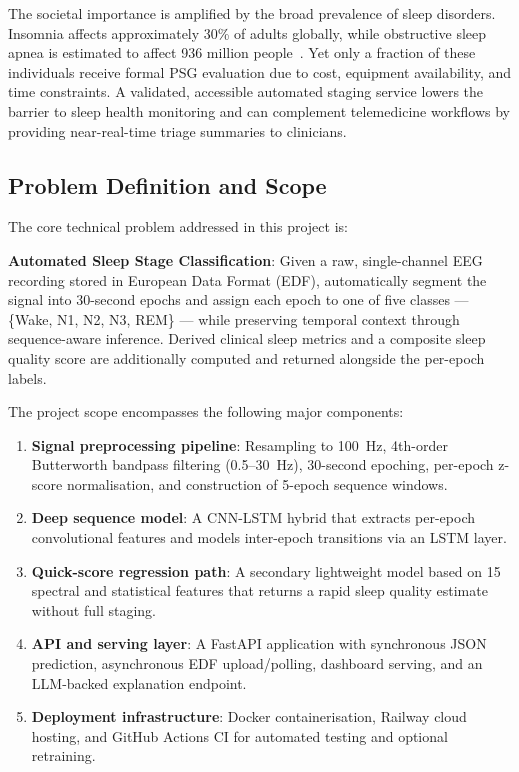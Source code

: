 \documentclass[10pt]{article}
\begin{document}
The societal importance is amplified by the broad prevalence of sleep disorders. Insomnia affects approximately 30\% of adults globally, while obstructive sleep apnea is estimated to affect 936 million people~\cite{benjafield2019estimation}. Yet only a fraction of these individuals receive formal PSG evaluation due to cost, equipment availability, and time constraints. A validated, accessible automated staging service lowers the barrier to sleep health monitoring and can complement telemedicine workflows by providing near-real-time triage summaries to clinicians.

\subsection{Problem Definition and Scope}
\label{sec:problem}

The core technical problem addressed in this project is:

\begin{definition}
\textbf{Automated Sleep Stage Classification}: Given a raw, single-channel EEG recording stored in European Data Format (EDF), automatically segment the signal into 30-second epochs and assign each epoch to one of five classes --- \{Wake, N1, N2, N3, REM\} --- while preserving temporal context through sequence-aware inference. Derived clinical sleep metrics and a composite sleep quality score are additionally computed and returned alongside the per-epoch labels.
\end{definition}

The project scope encompasses the following major components:

\begin{enumerate}
  \item \textbf{Signal preprocessing pipeline}: Resampling to 100~Hz, 4th-order Butterworth bandpass filtering (0.5--30~Hz), 30-second epoching, per-epoch z-score normalisation, and construction of 5-epoch sequence windows.
  \item \textbf{Deep sequence model}: A CNN-LSTM hybrid that extracts per-epoch convolutional features and models inter-epoch transitions via an LSTM layer.
  \item \textbf{Quick-score regression path}: A secondary lightweight model based on 15 spectral and statistical features that returns a rapid sleep quality estimate without full staging.
  \item \textbf{API and serving layer}: A FastAPI application with synchronous JSON prediction, asynchronous EDF upload/polling, dashboard serving, and an LLM-backed explanation endpoint.
  \item \textbf{Deployment infrastructure}: Docker containerisation, Railway cloud hosting, and GitHub Actions CI for automated testing and optional retraining.
\end{enumerate}
\end{document}
